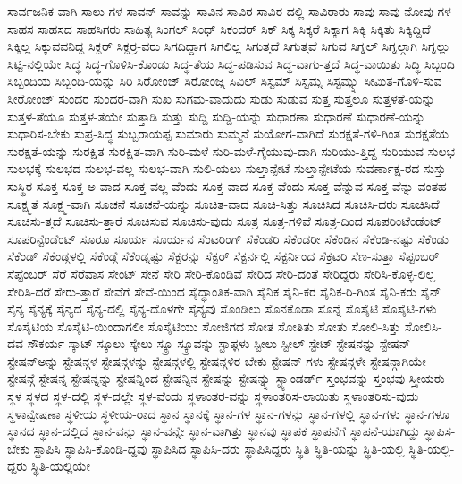 {ಸಾರ್ವಜನಿಕ-ವಾಗಿ
ಸಾಲು-ಗಳ
ಸಾವನ್
ಸಾವನ್ನು
ಸಾವಿನ
ಸಾವಿರ
ಸಾವಿರ-ದಲ್ಲಿ
ಸಾವಿರಾರು
ಸಾವು
ಸಾವು-ನೋವು-ಗಳ
ಸಾಹಸ
ಸಾಹಸದ
ಸಾಹಸಿಗರು
ಸಾಹಿತ್ಯ
ಸಿಂಗಲ್
ಸಿಂಧ್
ಸಿಕಂದರ್
ಸಿಕ್
ಸಿಕ್ಕ
ಸಿಕ್ಕರೆ
ಸಿಕ್ಕಾಗ
ಸಿಕ್ಕಿ
ಸಿಕ್ಕಿತು
ಸಿಕ್ಕಿದ್ದಿದೆ
ಸಿಕ್ಕಿಲ್ಲ
ಸಿಕ್ಕುವವನಿದ್ದ
ಸಿಕ್ದರ್
ಸಿಕ್ದರ್ರ-ವರು
ಸಿಗದಿದ್ದಾಗ
ಸಿಗಲಿಲ್ಲ
ಸಿಗುತ್ತದೆ
ಸಿಗುತ್ತವೆ
ಸಿಗುವ
ಸಿಗ್ನಲ್
ಸಿಗ್ನಲ್ಗಾಗಿ
ಸಿಗ್ನಲ್ಲು
ಸಿಟ್ಟಿ-ನಲ್ಲಿಯೇ
ಸಿದ್ಧ
ಸಿದ್ಧ-ಗೊಳಿಸಿ-ಕೊಂಡು
ಸಿದ್ಧ-ತೆಯ
ಸಿದ್ಧ-ಪಡಿಸುವ
ಸಿದ್ಧ-ವಾಗು-ತ್ತದೆ
ಸಿದ್ಧ-ವಾಯಿತು
ಸಿದ್ಧಿ
ಸಿಬ್ಬಂದಿ
ಸಿಬ್ಬಂದಿಯ
ಸಿಬ್ಬಂದಿ-ಯನ್ನು
ಸಿರಿ
ಸಿರೋಂಜ್
ಸಿರೋಂಜ್ನ
ಸಿವಿಲ್
ಸಿಸ್ಟಮ್
ಸಿಸ್ಟಮ್ನ
ಸಿಸ್ಟಮ್ನ್ನು
ಸೀಮಿತ-ಗೊಳಿ-ಸುವ
ಸೀರೋಂಜ್
ಸುಂದರ
ಸುಂದರ-ವಾಗಿ
ಸುಖ
ಸುಗಮ-ವಾದುದು
ಸುಡು
ಸುಡುವ
ಸುತ್ತ
ಸುತ್ತಲೂ
ಸುತ್ತಳತೆ-ಯನ್ನು
ಸುತ್ತಳ-ತೆಯೂ
ಸುತ್ತಳ-ತೆಯೇ
ಸುತ್ತಾಡಿ
ಸುತ್ತು
ಸುದ್ದಿ
ಸುದ್ದಿ-ಯನ್ನು
ಸುಧಾರಣಾ
ಸುಧಾರಣೆ
ಸುಧಾರಣೆ-ಯನ್ನು
ಸುಧಾರಿಸ-ಬೇಕು
ಸುಪ್ರ-ಸಿದ್ಧ
ಸುಬ್ಬರಾಯಪ್ಪ
ಸುಮಾರು
ಸುಮ್ಮನೆ
ಸುಯೋಗ-ವಾಗಿದೆ
ಸುರಕ್ಷತೆ-ಗಳಿ-ಗಿಂತ
ಸುರಕ್ಷತೆಯ
ಸುರಕ್ಷತೆ-ಯನ್ನು
ಸುರಕ್ಷಿತ
ಸುರಕ್ಷಿತ-ವಾಗಿ
ಸುರಿ-ಮಳೆ
ಸುರಿ-ಮಳೆ-ಗೈಯುವು-ದಾಗಿ
ಸುರಿಯು-ತ್ತಿದ್ದ
ಸುರಿಯುವ
ಸುಲಭ
ಸುಲಭಕ್ಕೆ
ಸುಲಭದ
ಸುಲಭ-ವಲ್ಲ
ಸುಲಭ-ವಾಗಿ
ಸುಲಿ-ಯಲು
ಸುಲ್ತಾನ್ಪೇಟೆ
ಸುಲ್ತಾನ್ಪೇಟೆಯ
ಸುವರ್ಣಾಕ್ಷ-ರದ
ಸುಸ್ತು
ಸುಸ್ಥಿರ
ಸೂಕ್ತ
ಸೂಕ್ತ-ಅ-ವಾದ
ಸೂಕ್ತ-ವಲ್ಲ-ವೆಂದು
ಸೂಕ್ತ-ವಾದ
ಸೂಕ್ತ-ವೆಂದು
ಸೂಕ್ತ-ವೆನ್ನುವ
ಸೂಕ್ತ-ವೆನ್ನು-ವಂತಹ
ಸೂಕ್ಷ್ಮತೆ
ಸೂಕ್ಷ್ಮ-ವಾಗಿ
ಸೂಚನೆ
ಸೂಚನೆ-ಯನ್ನು
ಸೂಚಿತ-ವಾದ
ಸೂಚಿ-ಸಿತ್ತು
ಸೂಚಿಸಿದ
ಸೂಚಿಸಿ-ದರು
ಸೂಚಿಸಿದೆ
ಸೂಚಿಸು-ತ್ತದೆ
ಸೂಚಿಸು-ತ್ತಾರೆ
ಸೂಚಿಸುವ
ಸೂಚಿಸು-ವುದು
ಸೂತ್ರ
ಸೂತ್ರ-ಗಳಿವೆ
ಸೂತ್ರ-ದಿಂದ
ಸೂಪರಿಂಟೆಂಡೆಂಟ್
ಸೂಪರಿನ್ಟೆಂಡೆಂಟ್
ಸೂರೂ
ಸೂರ್ಯ
ಸೂರ್ಯನ
ಸೆಂಟರಿಂಗ್
ಸೆಕೆಂಡರಿ
ಸೆಕೆಂಡರೀ
ಸೆಕೆಂಡಿನ
ಸೆಕೆಂಡಿ-ನಷ್ಟು
ಸೆಕೆಂಡು
ಸೆಕೆಂಡ್
ಸೆಕೆಂಡ್ಗಳಲ್ಲಿ
ಸೆಕೆಂಡ್ಗೆ
ಸೆಕೆಂಡ್ನಷ್ಟು
ಸೆಕ್ಟರನ್ನು
ಸೆಕ್ಟರ್
ಸೆಕ್ಟರ್ನಲ್ಲಿ
ಸೆಕ್ಟರ್ನಿಂದ
ಸೆಕ್ರಟರಿ
ಸೆಣ-ಸುತ್ತಾ
ಸೆಪ್ಟಂಬರ್
ಸೆಪ್ಟೆಂಬರ್
ಸೆರೆ
ಸೆರೆವಾಸ
ಸೇಂಟ್
ಸೇನೆ
ಸೇರಿ
ಸೇರಿ-ಕೊಂಡಿವೆ
ಸೇರಿದ
ಸೇರಿ-ದಂತೆ
ಸೇರಿದ್ದರು
ಸೇರಿಸಿ-ಕೊಳ್ಳ-ಲಿಲ್ಲ
ಸೇರಿಸಿ-ದರೆ
ಸೇರು-ತ್ತಾರೆ
ಸೇವೆಗೆ
ಸೇವೆ-ಯಿಂದ
ಸೈದ್ಧಾಂತಿಕ-ವಾಗಿ
ಸೈನಿಕ
ಸೈನಿ-ಕರ
ಸೈನಿಕ-ರಿ-ಗಿಂತ
ಸೈನಿ-ಕರು
ಸೈನ್
ಸೈನ್ಯ
ಸೈನ್ಯಕ್ಕೆ
ಸೈನ್ಯದ
ಸೈನ್ಯ-ದಲ್ಲಿ
ಸೈನ್ಯ-ದೊಳಗೇ
ಸೈನ್ಯವು
ಸೊಂಡಿಲು
ಸೊನಕೊಡಾ
ಸೊನ್ನೆ
ಸೊಸೈಟಿ
ಸೊಸೈಟಿ-ಗಳು
ಸೊಸೈಟಿಯ
ಸೊಸೈಟಿ-ಯಿಂದಾಗಲೀ
ಸೊಸೈಟಿಯು
ಸೋಜಿಗದ
ಸೋತ
ಸೋತಿತು
ಸೋತು
ಸೋಲಿ-ಸಿತ್ತು
ಸೋಲಿಸಿ-ದವ
ಸೌಕರ್ಯ
ಸ್ಕಾಟ್
ಸ್ಕೂಲು
ಸ್ಕೇಲು
ಸ್ಕ್ರೂ
ಸ್ಕ್ರೂವನ್ನು
ಸ್ಟಾಫ್ಗಳು
ಸ್ಟೀಲು
ಸ್ಟೀಲ್
ಸ್ಟೇಟ್
ಸ್ಟೇಷನನ್ನು
ಸ್ಟೇಷನ್
ಸ್ಟೇಷನ್ಅನ್ನು
ಸ್ಟೇಷನ್ಗಳ
ಸ್ಟೇಷನ್ಗಳನ್ನು
ಸ್ಟೇಷನ್ಗಳಲ್ಲಿ
ಸ್ಟೇಷನ್ಗಳಿರ-ಬೇಕು
ಸ್ಟೇಷನ್-ಗಳು
ಸ್ಟೇಷನ್ಗಳೇ
ಸ್ಟೇಷನ್ಗಾಗಿಯೇ
ಸ್ಟೇಷನ್ಗೆ
ಸ್ಟೇಷನ್ನ
ಸ್ಟೇಷನ್ನನ್ನು
ಸ್ಟೇಷನ್ನಿಂದ
ಸ್ಟೇಷನ್ನಿನ
ಸ್ಟೇಷನ್ನು
ಸ್ಟೇಷನ್ನ್ನು
ಸ್ಟ್ಯಾಂಡರ್ಡ್
ಸ್ತಂಭವನ್ನು
ಸ್ತಂಭವು
ಸ್ತ್ರೀಯರು
ಸ್ಥಳ
ಸ್ಥಳದ
ಸ್ಥಳ-ದಲ್ಲಿ
ಸ್ಥಳ-ದಲ್ಲೇ
ಸ್ಥಳ-ವೆಂದು
ಸ್ಥಳಾಂತರ-ವನ್ನು
ಸ್ಥಳಾಂತರಿಸ-ಲಾಯಿತು
ಸ್ಥಳಾಂತರಿಸು-ವುದು
ಸ್ಥಳಾನ್ವೇಷಣಾ
ಸ್ಥಳೀಯ
ಸ್ಥಳೀಯ-ರಾದ
ಸ್ಥಾನ
ಸ್ಥಾನಕ್ಕೆ
ಸ್ಥಾನ-ಗಳ
ಸ್ಥಾನ-ಗಳನ್ನು
ಸ್ಥಾನ-ಗಳಲ್ಲಿ
ಸ್ಥಾನ-ಗಳು
ಸ್ಥಾನ-ಗಳೂ
ಸ್ಥಾನದ
ಸ್ಥಾನ-ದಲ್ಲಿದೆ
ಸ್ಥಾನ-ವನ್ನು
ಸ್ಥಾನ-ವನ್ನೇ
ಸ್ಥಾನ-ವಾಗಿತ್ತು
ಸ್ಥಾನವು
ಸ್ಥಾಪಕ
ಸ್ಥಾಪನೆಗೆ
ಸ್ಥಾಪನೆ-ಯಾಗಿದ್ದು
ಸ್ಥಾಪಿಸ-ಬೇಕು
ಸ್ಥಾಪಿಸಿ
ಸ್ಥಾಪಿಸಿ-ಕೊಂಡಿ-ದ್ದವು
ಸ್ಥಾಪಿಸಿದ
ಸ್ಥಾಪಿಸಿ-ದರು
ಸ್ಥಾಪಿಸಿದ್ದರು
ಸ್ಥಿತಿ
ಸ್ಥಿತಿ-ಯನ್ನು
ಸ್ಥಿತಿ-ಯಲ್ಲಿ
ಸ್ಥಿತಿ-ಯಲ್ಲಿ-ದ್ದರು
ಸ್ಥಿತಿ-ಯಲ್ಲಿಯೇ
}

